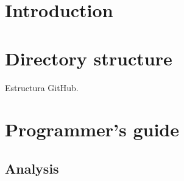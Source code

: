 
\section{Introduction}

\section{Directory structure}
Estructura GitHub.

\section{Programmer's guide}

\subsection{Analysis}

